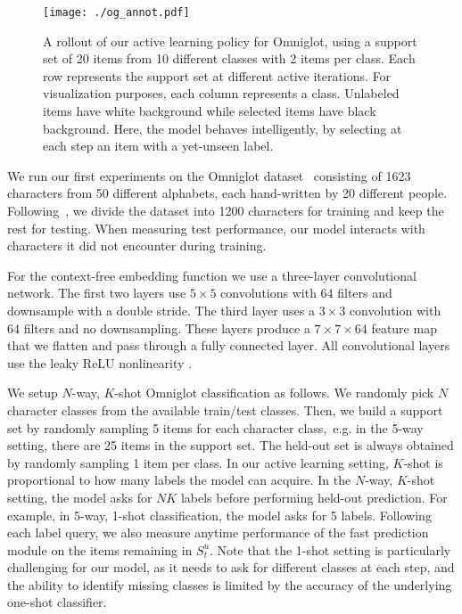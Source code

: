 \begin{figure}[t]
\begin{center}
\vspace{-0.1cm}
\hspace{-0.5cm}
\texttt{[image: ./og\_annot.pdf]}
\vspace{-0.25cm}
\caption{A rollout of our active learning policy for Omniglot, using a support set of 20 items from 10 different classes with 2 items per class. Each row represents the support set at different active iterations. For visualization purposes, each column represents a class. Unlabeled items have white background while selected items have black background. Here, the model behaves intelligently, by selecting at each step an item with a yet-unseen label.}
\label{fig:og_rollout}
\end{center}
\vspace{-0.5cm}
\end{figure}

We run our first experiments on the Omniglot dataset~\citep{lake2015human} consisting of 1623 characters from 50 different alphabets, each hand-written by 20 different people.
Following~\citet{vinyals2016matching}, we divide the dataset into 1200 characters for training and keep the rest for testing. When measuring test performance, our model interacts with characters it did not encounter during training.
%
%

For the context-free embedding function we use a three-layer convolutional network. The first two layers use $5 \times 5$ convolutions with 64 filters and downsample with a double stride. The third layer uses a $3 \times 3$ convolution with 64 filters and no downsampling. These layers produce a $7 \times 7 \times 64$ feature map that we flatten and pass through a fully connected layer. All convolutional layers use the leaky ReLU nonlinearity \cite{Maas2013}.

We setup $N$-way, $K$-shot Omniglot classification as follows. We randomly pick $N$ character classes from the available train/test classes. Then, we build a support set by randomly sampling 5 items for each character class,~e.g. in the 5-way setting, there are 25 items in the support set. The held-out set is always obtained by randomly sampling 1 item per class.
In our active learning setting, $K$-shot is proportional to how many labels the model can acquire. In the $N$-way, $K$-shot setting, the model asks for $NK$ labels before performing held-out prediction. For example, in 5-way, 1-shot classification, the model asks for 5 labels. Following each label query, we also measure anytime performance of the fast prediction module on the items remaining in $S^u_t$. Note that the 1-shot setting is particularly challenging for our model, as it needs to ask for different classes at each step, and the ability to identify missing classes is limited by the accuracy of the underlying one-shot classifier.


